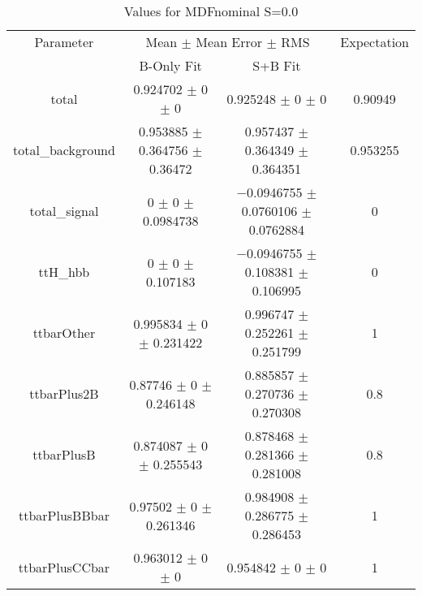 \begin{table}
\centering
\caption{Values for MDFnominal S=0.0}
\begin{tabular}{cccc}
\toprule
Parameter & \multicolumn{2}{c}{Mean $\pm$ Mean Error $\pm$ RMS} & Expectation\\
 & B-Only Fit & S+B Fit & \\
\midrule
total & \num{0.924702} $\pm$ \num{0} $\pm$ \num{0} & \num{0.925248} $\pm$ \num{0} $\pm$ \num{0} & \num{0.90949}\\
total\_background & \num{0.953885} $\pm$ \num{0.364756} $\pm$ \num{0.36472} & \num{0.957437} $\pm$ \num{0.364349} $\pm$ \num{0.364351} & \num{0.953255}\\
total\_signal & \num{0} $\pm$ \num{0} $\pm$ \num{0.0984738} & \num{-0.0946755} $\pm$ \num{0.0760106} $\pm$ \num{0.0762884} & \num{0}\\
ttH\_hbb & \num{0} $\pm$ \num{0} $\pm$ \num{0.107183} & \num{-0.0946755} $\pm$ \num{0.108381} $\pm$ \num{0.106995} & \num{0}\\
ttbarOther & \num{0.995834} $\pm$ \num{0} $\pm$ \num{0.231422} & \num{0.996747} $\pm$ \num{0.252261} $\pm$ \num{0.251799} & \num{1}\\
ttbarPlus2B & \num{0.87746} $\pm$ \num{0} $\pm$ \num{0.246148} & \num{0.885857} $\pm$ \num{0.270736} $\pm$ \num{0.270308} & \num{0.8}\\
ttbarPlusB & \num{0.874087} $\pm$ \num{0} $\pm$ \num{0.255543} & \num{0.878468} $\pm$ \num{0.281366} $\pm$ \num{0.281008} & \num{0.8}\\
ttbarPlusBBbar & \num{0.97502} $\pm$ \num{0} $\pm$ \num{0.261346} & \num{0.984908} $\pm$ \num{0.286775} $\pm$ \num{0.286453} & \num{1}\\
ttbarPlusCCbar & \num{0.963012} $\pm$ \num{0} $\pm$ \num{0} & \num{0.954842} $\pm$ \num{0} $\pm$ \num{0} & \num{1}\\
\bottomrule
\end{tabular}
\end{table}